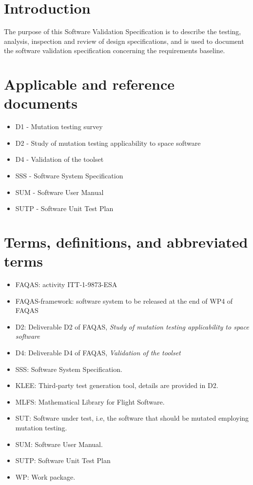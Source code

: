 
\chapter{Introduction}

The purpose of this  Software Validation Specification is to describe the testing, analysis, inspection and
review of design specifications, and is used to document the software validation specification concerning the requirements baseline.

\chapter{Applicable and reference documents}

\begin{itemize}
\item{D1 - Mutation testing survey}
\item{D2 - Study of mutation testing applicability to space software}
\item{D4 - Validation of the toolset}
\item{SSS - Software System Specification}
\item{SUM - Software User Manual}
\item{SUTP - Software Unit Test Plan}
\end{itemize}

\chapter{Terms, definitions, and abbreviated terms}

\begin{itemize}
\item{FAQAS}: activity ITT-1-9873-ESA
\item{FAQAS-framework}: software system to be released at the end of WP4 of FAQAS
\item{D2}: Deliverable D2 of FAQAS, \emph{Study of mutation testing applicability to space software}
\item{D4}: Deliverable D4 of FAQAS, \emph{Validation of the toolset}
\item{SSS}: Software System Specification.
\item{KLEE}: Third-party test generation tool, details are provided in D2.
\item{MLFS}: Mathematical Library for Flight Software.
\item{SUT}: Software under test, i.e, the software that should be mutated employing mutation testing.
\item{SUM}: Software User Manual.
\item{SUTP}: Software Unit Test Plan
\item{WP}: Work package.
\end{itemize}

